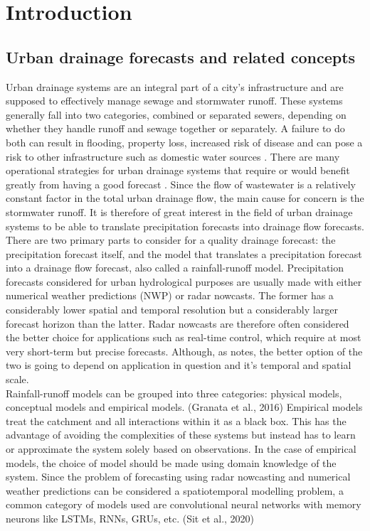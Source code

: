 \chapter{Introduction}

\section{Urban drainage forecasts and related concepts}
Urban drainage systems are an integral part of a city’s infrastructure and are supposed to effectively manage sewage and stormwater runoff. These systems generally fall into two categories, combined or separated sewers, depending on whether they handle runoff and sewage together or separately. A failure to do both can result in flooding, property loss, increased risk of disease and can pose a risk to other infrastructure such as domestic water sources \cite{RN284}. There are many operational strategies for urban drainage systems that require or would benefit greatly from having a good forecast \cite{ThorndahlRadar}. Since the flow of wastewater is a relatively constant factor in the total urban drainage flow, the main cause for concern is the stormwater runoff. It is therefore of great interest in the field of urban drainage systems to be able to translate precipitation forecasts into drainage flow forecasts.\\
There are two primary parts to consider for a quality drainage forecast: the precipitation forecast itself, and the model that translates a precipitation forecast into a drainage flow forecast, also called a rainfall-runoff model. Precipitation forecasts considered for urban hydrological purposes are usually made with either numerical weather predictions (NWP) or radar nowcasts. The former has a considerably lower spatial and temporal resolution but a considerably larger forecast horizon than the latter. Radar nowcasts are therefore often considered the better choice for applications such as real-time control, which require at most very short-term but precise forecasts. Although, as \cite{jonasphd} notes, the better option of the two is going to depend on application in question and it’s temporal and spatial scale. \\
Rainfall-runoff models can be grouped into three categories: physical models, conceptual models and empirical models. (Granata et al., 2016) Empirical models treat the catchment and all interactions within it as a black box. This has the advantage of avoiding the complexities of these systems but instead has to learn or approximate the system solely based on observations. In the case of empirical models, the choice of model should be made using domain knowledge of the system. Since the problem of forecasting using radar nowcasting and numerical weather predictions can be considered a spatiotemporal modelling problem, a common category of models used are convolutional neural networks with memory neurons like LSTMs, RNNs, GRUs, etc. (Sit et al., 2020) \\
